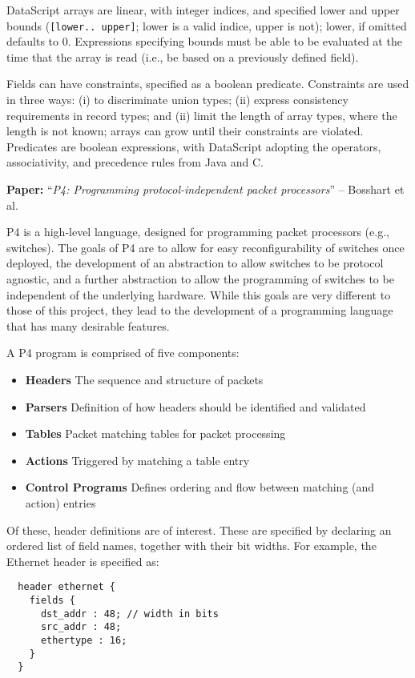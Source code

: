 \documentclass[10pt]{article}
\newcommand{\paper}[3]{\vspace{4mm}\noindent\textbf{Paper:} ``\textit{#1}'' -- #2 \cite{#3}\vspace{3mm}}
\begin{document}
DataScript arrays are linear, with integer indices, and specified lower and upper
bounds (\texttt{[lower.. upper]}; lower is a valid indice, upper is not); lower, if
omitted defaults to 0. Expressions specifying bounds must be able to be evaluated at the
time that the array is read (i.e., be based on a previously defined field). 

Fields can have constraints, specified as a boolean predicate. Constraints are used in
three ways: (i) to discriminate union types; (ii) express consistency requirements in
record types; and (ii) limit the length of array types, where the length is not known;
arrays can grow until their constraints are violated. Predicates are boolean expressions,
with DataScript adopting the operators, associativity, and precedence rules from Java and
C. 

\paper{P4: Programming protocol-independent packet processors}{Bosshart et al.}{bosshart2014p4}

P4 is a high-level language, designed for programming packet processors (e.g., switches).
The goals of P4 are to allow for easy reconfigurability of switches once deployed,
the development of an abstraction to allow switches to be protocol agnostic, and a further
abstraction to allow the programming of switches to be independent of the underlying
hardware. While this goals are very different to those of this project, they lead to the
development of a programming language that has many desirable features.

A P4 program is comprised of five components:
\begin{itemize}
\item \textbf{Headers} The sequence and structure of packets
\item \textbf{Parsers} Definition of how headers should be identified and validated
\item \textbf{Tables} Packet matching tables for packet processing
\item \textbf{Actions} Triggered by matching a table entry
\item \textbf{Control Programs} Defines ordering and flow between matching (and action) entries
\end{itemize}

Of these, header definitions are of interest. These are specified by declaring an ordered
list of field names, together with their bit widths. For example, the Ethernet header is
specified as:

\begin{verbatim}
  header ethernet {
    fields {
      dst_addr : 48; // width in bits
      src_addr : 48;
      ethertype : 16;
    }
  }
\end{verbatim}
\end{document}
